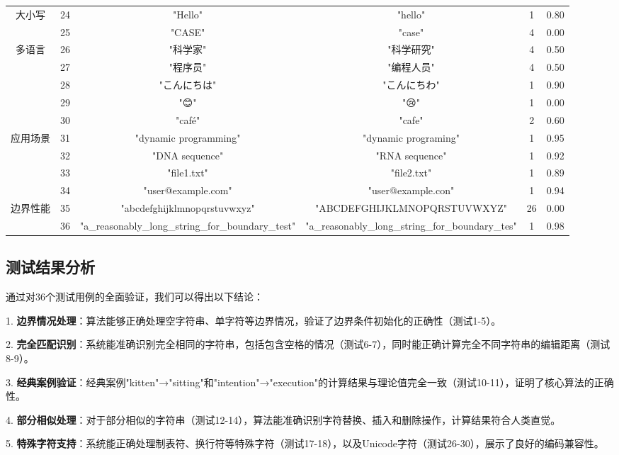 \documentclass[a4paper]{article}
\begin{document}
\begin{table}[H]
{\begin{tabular}{|c|c|c|c|c|c|}
			\hline
			\multirow{2}{*}{大小写} 
			& 24 & "Hello" & "hello" & 1 & 0.80 \\
			& 25 & "CASE" & "case" & 4 & 0.00 \\
			\hline
			\multirow{5}{*}{多语言} 
			& 26 & "科学家" & "科学研究" & 4 & 0.50 \\
			& 27 & "程序员" & "编程人员" & 4 & 0.50 \\
			& 28 & "こんにちは" & "こんにちわ" & 1 & 0.90 \\
			& 29 & "😊" & "😢" & 1 & 0.00 \\
			& 30 & "café" & "cafe" & 2 & 0.60 \\
			\hline
			\multirow{4}{*}{应用场景} 
			& 31 & "dynamic programming" & "dynamic programing" & 1 & 0.95 \\
			& 32 & "DNA sequence" & "RNA sequence" & 1 & 0.92 \\
			& 33 & "file1.txt" & "file2.txt" & 1 & 0.89 \\
			& 34 & "user@example.com" & "user@example.con" & 1 & 0.94 \\
			\hline
			\multirow{2}{*}{边界性能} 
			& 35 & "abcdefghijklmnopqrstuvwxyz" & "ABCDEFGHIJKLMNOPQRSTUVWXYZ" & 26 & 0.00 \\
			& 36 & "a\_reasonably\_long\_string\_for\_boundary\_test" & "a\_reasonably\_long\_string\_for\_boundary\_tes" & 1 & 0.98 \\
			\hline
		\end{tabular}
	}
\end{table}

\subsection{测试结果分析}
通过对36个测试用例的全面验证，我们可以得出以下结论：

1. \textbf{边界情况处理}：算法能够正确处理空字符串、单字符等边界情况，验证了边界条件初始化的正确性（测试1-5）。

2. \textbf{完全匹配识别}：系统能准确识别完全相同的字符串，包括包含空格的情况（测试6-7），同时能正确计算完全不同字符串的编辑距离（测试8-9）。

3. \textbf{经典案例验证}：经典案例"kitten"→"sitting"和"intention"→"execution"的计算结果与理论值完全一致（测试10-11），证明了核心算法的正确性。

4. \textbf{部分相似处理}：对于部分相似的字符串（测试12-14），算法能准确识别字符替换、插入和删除操作，计算结果符合人类直觉。

5. \textbf{特殊字符支持}：系统能正确处理制表符、换行符等特殊字符（测试17-18），以及Unicode字符（测试26-30），展示了良好的编码兼容性。
\end{document}
